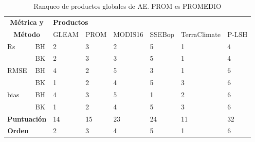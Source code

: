\begin{table}[hbt]
\caption{Ranqueo de productos globales de AE. PROM es PROMEDIO}
\label{tab:Table_rank}
\begin{tabular}{llllllll}
\hline
\multicolumn{2}{c}{\textbf{Métrica y}}  & \multicolumn{6}{l}{\textbf{Productos}}                 \\
\multicolumn{2}{c}{\textbf{Método}}     & GLEAM & PROM & MODIS16 & SSEBop & TerraClimate & P-LSH \\ \hline
Rs                   & BH               & 2     & 3    & 2       & 5      & 1            & 4     \\
                     & BK               & 2     & 3    & 3       & 5      & 1            & 4     \\
RMSE                 & BH               & 4     & 2    & 5       & 3      & 1            & 6     \\
                     & BK               & 1     & 2    & 4       & 5      & 3            & 6     \\
bias                 & BH               & 4     & 3    & 5       & 1      & 2            & 6     \\
                     & BK               & 1     & 2    & 4       & 5      & 3            & 6     \\ \hline
\multicolumn{2}{l}{\textbf{Puntuación}} & 14     & 15   & 23      & 24     & 11           & 32    \\ \hline
\multicolumn{2}{l}{\textbf{Orden}}      & 2     & 3    & 4       & 5      & 1            & 6     \\ \hline
\end{tabular}
\end{table}
